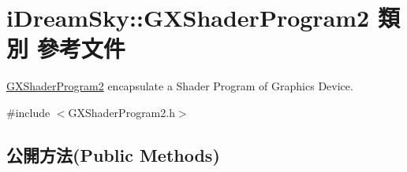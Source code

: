 \hypertarget{classi_dream_sky_1_1_g_x_shader_program2}{}\section{i\+Dream\+Sky\+:\+:G\+X\+Shader\+Program2 類別 參考文件}
\label{classi_dream_sky_1_1_g_x_shader_program2}


\hyperlink{classi_dream_sky_1_1_g_x_shader_program2}{G\+X\+Shader\+Program2} encapsulate a Shader Program of Graphics Device.  




{\ttfamily \#include $<$G\+X\+Shader\+Program2.\+h$>$}

\subsection*{公開方法(Public Methods)}
